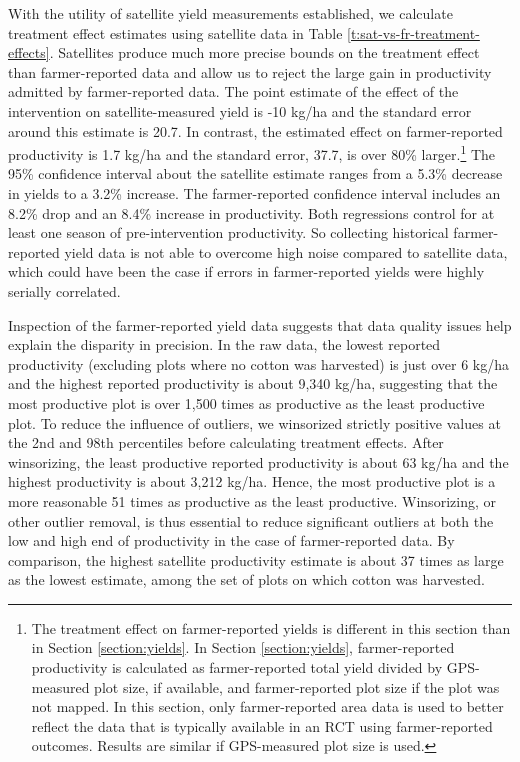 \documentclass{article}
\begin{document}
With the utility of satellite yield measurements established, we calculate treatment effect estimates using satellite data in Table \ref{t:sat-vs-fr-treatment-effects}. Satellites produce much more precise bounds on the treatment effect than farmer-reported data and allow us to reject the large gain in productivity admitted by farmer-reported data. The point estimate of the effect of the intervention on satellite-measured yield is -10 kg/ha and the standard error around this estimate is 20.7. In contrast, the estimated effect on farmer-reported productivity is 1.7 kg/ha and the standard error, 37.7, is over 80\% larger.\footnote{The treatment effect on farmer-reported yields is different in this section than in Section \ref{section:yields}. In Section \ref{section:yields}, farmer-reported productivity is calculated as farmer-reported total yield divided by GPS-measured plot size, if available, and farmer-reported plot size if the plot was not mapped. In this section, only farmer-reported area data is used to better reflect the data that is typically available in an RCT using farmer-reported outcomes. Results are similar if GPS-measured plot size is used.} The 95\% confidence interval about the satellite estimate ranges from a 5.3\% decrease in yields to a 3.2\% increase. The farmer-reported confidence interval includes an 8.2\% drop and an 8.4\% increase in productivity. Both regressions control for at least one season of pre-intervention productivity. So collecting historical farmer-reported yield data is not able to overcome high noise compared to satellite data, which could have been the case if errors in farmer-reported yields were highly serially correlated. 

Inspection of the farmer-reported yield data suggests that data quality issues help explain the disparity in precision. In the raw data, the lowest reported productivity (excluding plots where no cotton was harvested) is just over 6 kg/ha and the highest reported productivity is about 9,340 kg/ha, suggesting that the most productive plot is over 1,500 times as productive as the least productive plot. To reduce the influence of outliers, we winsorized strictly positive values at the 2nd and 98th percentiles before calculating treatment effects. After winsorizing, the least productive reported productivity is about 63 kg/ha and the highest productivity is about 3,212 kg/ha. Hence, the most productive plot is a more reasonable 51 times as productive as the least productive. Winsorizing, or other outlier removal, is thus essential to reduce significant outliers at both the low and high end of productivity in the case of farmer-reported data. By comparison, the highest satellite productivity estimate is about 37 times as large as the lowest estimate, among the set of plots on which cotton was harvested.
\end{document}
